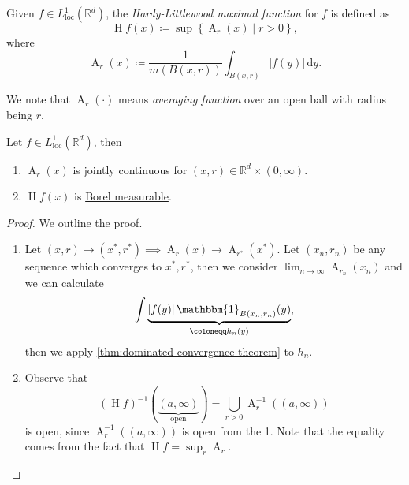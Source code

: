 \begin{definition}\label{def:HL-maximal-function}
	Given \(f\in L^1_{\text{loc} }(\mathbb{R} ^d)\), the \emph{Hardy-Littlewood maximal function} for \(f\) is defined as
	\[
		\operatorname{H}f(x) \coloneqq \sup \left\{\operatorname{A}_r(x)\mid r > 0\right\},
	\]
	where
	\[
		\operatorname{A}_r(x) \coloneqq \frac{1}{m(B(x, r))}\int _{B(x, r)} \left\vert f(y) \right\vert \,\mathrm{d}y.
	\]
\end{definition}
\begin{note}
	We note that \(\operatorname{A}_r(\cdot) \) means \emph{averaging function} over an open ball with radius being \(r\).
\end{note}
\begin{lemma}\label{lma:lec21}
	Let \(f\in L^1_{\text{loc} }(\mathbb{R} ^d)\), then
	\begin{enumerate}[(1)]
		\item \(\operatorname{A}_r(x)\) is jointly continuous for \((x, r)\in \mathbb{R} ^d \times (0, \infty )\).
		\item \(\operatorname{H}f(x) \) is \hyperref[def:Borel-measurable-function]{Borel measurable}.
	\end{enumerate}
\end{lemma}
\begin{proof}
	We outline the proof.
	\begin{enumerate}[(1)]
		\item Let \((x, r)\to (x^\ast, r^\ast)\implies \operatorname{A}_r(x)\to \operatorname{A}_{r^\ast}(x^\ast)\). Let \((x_{n} , r_{n} )\) be any sequence which converges to
		      \(x^\ast, r^\ast\), then we consider \(\lim_{n \to \infty} \operatorname{A}_{r_{n} }(x_{n} )\) and we can calculate
		      \[
			      \int\underbrace{\left\vert f(y) \right\vert \mathbbm{1}_{B(x_{n} , r_{n} )} (y)}_{\coloneqq h_{n} (y)},
		      \]
		      then we apply \autoref{thm:dominated-convergence-theorem} to \(h_{n} \).
		\item Observe that
		      \[
			      (\operatorname{H}f)^{-1} (\underbrace{(a, \infty )}_{\text{open} }) = \bigcup_{r>0} \operatorname{A}_{r} ^{-1} \left((a, \infty )\right)
		      \]
		      is open, since \(\operatorname{A} _{r} ^{-1} \left((a, \infty )\right)\) is open from the 1. Note that the equality comes from the fact that \(\operatorname{H}f = \sup_{r} \operatorname{A} _{r} \).
	\end{enumerate}
\end{proof}

